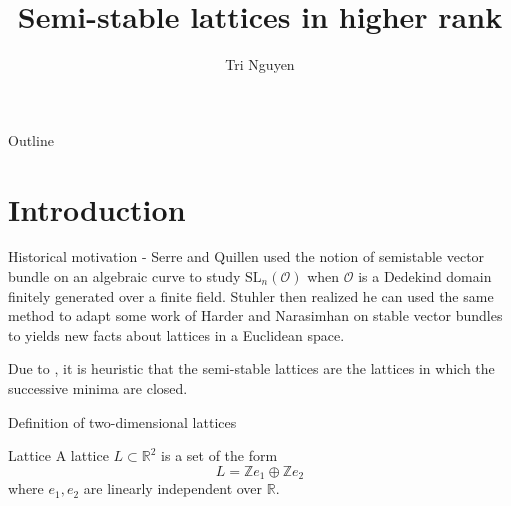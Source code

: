 \documentclass[pdf]{beamer}
\title{Semi-stable lattices in higher rank}
\author{Tri Nguyen}
\begin{document}
\begin{frame}
    \titlepage
\end{frame}

\begin{frame}{Outline}
    \tableofcontents
\end{frame}

\section{Introduction}
\begin{frame}{Historical motivation - \cite{grayson1984reduction}}
    Serre and Quillen used the notion of semistable vector
    bundle on an algebraic curve to study $\text{SL}_n(\mathcal{O})$ when $\mathcal{O}$ is a Dedekind domain finitely generated over a finite field. Stuhler
    then realized he can used the same method to adapt some work of Harder and Narasimhan on stable vector bundles to yields new facts
    about lattices in a Euclidean space.
\end{frame}
\begin{frame}
    Due to \cite{borek2005successive} , it is heuristic that the semi-stable lattices are the lattices in which the successive minima are closed.
\end{frame}
\begin{frame}{Definition of two-dimensional lattices}
    \begin{block}{Lattice}
        A lattice $L \subset \mathbb{R}^2$ is a set of the form
        \[L = \mathbb{Z}e_1\oplus\mathbb{Z}e_2\]
        where $e_1,e_2$ are linearly independent over $\mathbb{R}$.
    \end{block}
\end{frame}
\end{document}
